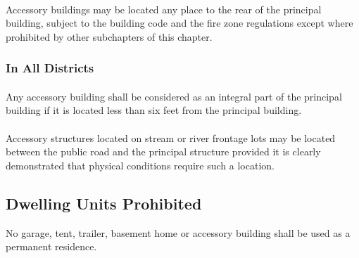 \paragraph{}
Accessory buildings may be located any place to the rear of the principal building, subject to the building code and the fire zone regulations except where prohibited by other subchapters of this chapter.
\subsubsection{In All Districts}
\paragraph{}
Any accessory building shall be considered as an integral part of the principal building if it is located less than six feet from the principal building.
\paragraph{}
Accessory structures located on stream or river frontage lots may be located between the public road and the principal structure provided it is clearly demonstrated that physical conditions require such a location.
\subsection{Dwelling Units Prohibited}
No garage, tent, trailer, basement home or accessory building shall be used as a permanent residence.

